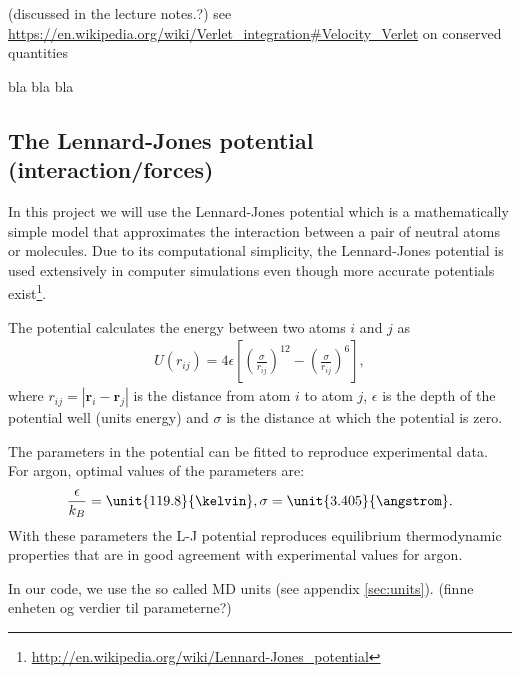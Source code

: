 \documentclass[11pt,a4wide]{article}
\renewcommand{\vec}{\mathbf}
\begin{document}
(discussed in the lecture notes.?)
  see \url{https://en.wikipedia.org/wiki/Verlet\_integration\#Velocity\_Verlet} on conserved quantities
  
bla bla bla  

\subsection{The Lennard-Jones potential (interaction/forces)} \label{sec: L-Jpot_forces}

In this project we will use the Lennard-Jones potential which is a mathematically simple model that approximates the interaction between a pair of neutral atoms or molecules. Due to its computational simplicity, the Lennard-Jones potential is used extensively in computer simulations even though more accurate potentials exist\footnote{\url{http://en.wikipedia.org/wiki/Lennard-Jones_potential}}.

The potential calculates the energy between two atoms $i$ and $j$ as
\begin{align}
	U(r_{ij}) = 4\epsilon\left[\left(\frac{\sigma}{r_{ij}}\right)^{12} - \left(\frac{\sigma}{r_{ij}}\right)^6\right],
\end{align}
where $r_{ij} = |\vec r_i - \vec r_j|$ is the distance from atom $i$ to atom $j$, $\epsilon$ is the depth of the potential well (units energy) and $\sigma$ is the distance at which the potential is zero. 

The parameters in the potential can be fitted to reproduce experimental data. For argon, optimal values of the parameters are:
\begin{align}
	\frac{\epsilon}{k_B} = \unit{119.8}{\kelvin}, \sigma=\unit{3.405}{\angstrom}.
\end{align}
With these parameters the L-J potential reproduces equilibrium thermodynamic properties that are in good agreement with experimental values for argon.

In our code, we use the so called MD units (see appendix \ref{sec:units}). (finne enheten og verdier til parameterne?)

\end{document}
